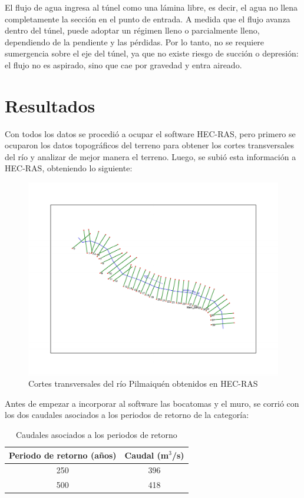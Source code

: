 \documentclass{article} %
\begin{document}
El flujo de agua ingresa al túnel como una lámina libre, es decir, el agua no llena completamente la sección en el punto de entrada. A medida que el flujo avanza dentro del túnel, puede adoptar un régimen lleno o parcialmente lleno, dependiendo de la pendiente y las pérdidas. Por lo tanto, no se requiere sumergencia sobre el eje del túnel, ya que no existe riesgo de succión o depresión: el flujo no es aspirado, sino que cae por gravedad y entra aireado.



\newpage
\section{Resultados}

Con todos los datos se procedió a ocupar el software HEC-RAS, pero primero se ocuparon los datos topográficos del terreno para obtener los cortes transversales del río y analizar de mejor manera el terreno. Luego, se subió esta información a HEC-RAS, obteniendo lo siguiente:

\begin{figure}[h!]
    \centering
    \includegraphics[width=0.6\linewidth]{imagenes/rio_sin_estruc.pdf}
    \caption{Cortes transversales del río Pilmaiquén obtenidos en HEC-RAS}
\end{figure}

Antes de empezar a incorporar al software las bocatomas y el muro, se corrió con los dos caudales asociados a los periodos de retorno de la categoría:

\begin{table}[h]
    \centering
    \begin{tabular}{c c}
        \textbf{Periodo de retorno (años)} & \textbf{Caudal (m$^3$/s)} \\
        \hline
        250 & 396 \\ 
        500 & 418 \\\hline
    \end{tabular}
    \caption{Caudales asociados a los periodos de retorno}
\end{table}
\end{document}

